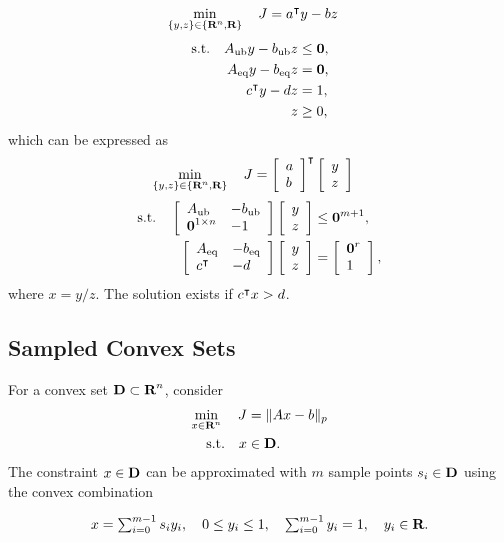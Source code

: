\documentclass{article}
\begin{document}
    \begin{align*}
        \min_{\{y,z\}\in\{\textbf{R}^n,\textbf{R}\}}\quad J & = a^\intercal y - b z
    \end{align*}
    \begin{align*}
        \text{s.t.}\quad A_{\text{ub}} y-b_{\text{ub}} z&\leq \textbf{0},\\
        A_{\text{eq}} y-b_{\text{eq}} z&=\textbf{0},\\
        c^\intercal y - d z &=1,\\
        z&\geq 0,
    \end{align*}
    which can be expressed as
    \begin{align*}
        \min_{\{y,z\}\in\{\textbf{R}^n,\textbf{R}\}}\quad J & = \left[\begin{array}{lllllllllllllllllll}a \\ b\end{array}\right]^\intercal \left[\begin{array}{lllllllllllllllllll}y \\ z\end{array}\right]
    \end{align*}
    \begin{align*}
        \text{s.t.}\quad \left[\begin{array}{lllllllllllllllllll}A_{\text{ub}} & -b_{\text{ub}} \\ \textbf{0}^{1\times n} & -1 \end{array}\right]\left[\begin{array}{lllllllllllllllllll}y\\z\end{array}\right]&
        \leq \textbf{0}^{m+1},\\
        \left[\begin{array}{lllllllllllllllllll} A_{\text{eq}} & -b_{\text{eq}} \\
        c^\intercal & - d 
        \end{array}\right]\left[\begin{array}{lllllllllllllllllll}y \\z\end{array}\right]&=\left[\begin{array}{lllllllllllllllllll}\textbf{0}^r \\ 1 \end{array}\right],
    \end{align*}
    where $x=y/z$.  The solution exists if $c^\intercal x>d$.\\

\subsection{Sampled Convex Sets}

    For a convex set $\textbf{D}\subset\textbf{R}^n$, consider
    \begin{align*}
        \min_{x\in\textbf{R}^n}\quad J &= \|Ax-b\|_p\\
        \text{s.t.} \quad x&\in\textbf{D}.
    \end{align*}
    The constraint $x\in \textbf{D}$ can be approximated with $m$ sample points $s_i\in \textbf{D}$ 
    using the convex combination \cite[p.~24]{bv_cvxbook}

    \begin{align*}
            x = \textstyle\sum_{i=0}^{m-1} s_iy_i,
        \quad
            0 \leq y_i \leq 1,
        \quad
        \textstyle\sum_{i=0}^{m-1}y_i=1,
        \quad
            y_i\in\textbf{R}. 
    \end{align*}
\end{document}
